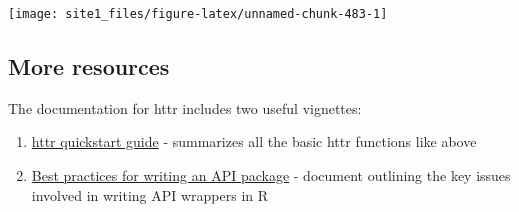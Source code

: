 \documentclass[]{book}
\newenvironment{Shaded}{\begin{snugshade}}{\end{snugshade}}
\newcommand{\KeywordTok}[1]{\textcolor[rgb]{0.13,0.29,0.53}{\textbf{#1}}}
\newcommand{\DataTypeTok}[1]{\textcolor[rgb]{0.13,0.29,0.53}{#1}}
\newcommand{\DecValTok}[1]{\textcolor[rgb]{0.00,0.00,0.81}{#1}}
\newcommand{\StringTok}[1]{\textcolor[rgb]{0.31,0.60,0.02}{#1}}
\newcommand{\CommentTok}[1]{\textcolor[rgb]{0.56,0.35,0.01}{\textit{#1}}}
\newcommand{\OperatorTok}[1]{\textcolor[rgb]{0.81,0.36,0.00}{\textbf{#1}}}
\newcommand{\NormalTok}[1]{#1}
\providecommand{\tightlist}{%
  \setlength{\itemsep}{0pt}\setlength{\parskip}{0pt}}
\begin{document}
\begin{Shaded}
\end{Shaded}

\begin{center}\texttt{[image: site1\_files/figure-latex/unnamed-chunk-483-1]} \end{center}

\subsection{More resources}\label{more-resources-1}

The documentation for httr includes two useful vignettes:

\begin{enumerate}
\def\labelenumi{\arabic{enumi}.}
\tightlist
\item
  \href{https://cran.r-project.org/web/packages/httr/vignettes/quickstart.html}{httr
  quickstart guide} - summarizes all the basic httr functions like above
\item
  \href{https://cran.r-project.org/web/packages/httr/vignettes/api-packages.html}{Best
  practices for writing an API package} - document outlining the key
  issues involved in writing API wrappers in R
\end{enumerate}
\end{document}
